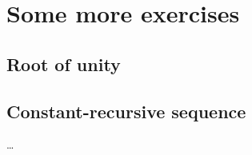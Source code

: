 \documentclass[
	fontsize=10pt, %
	twoside=true, %
	secnumdepth=1, %
	numbers=noenddot, %
]{kaobook}
\begin{document}

\setchapterpreamble[u]{\margintoc}
\chapter{Some more exercises}

\section{Root of unity}\label{Extra:RootUnity}

\section{Constant-recursive sequence}\label{Extra:RecursiveSequence}

\dots


\backmatter %






\end{document}
